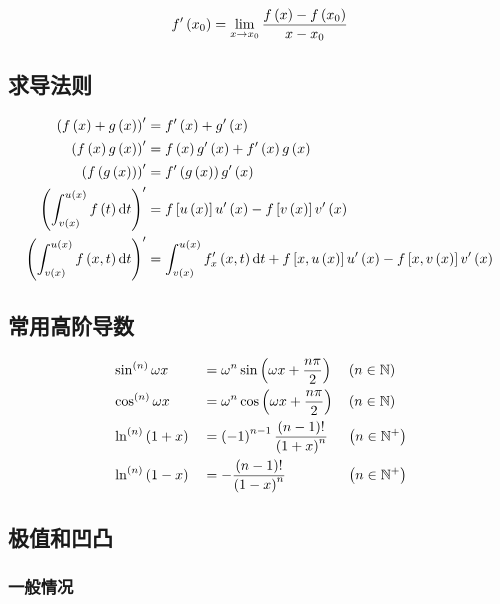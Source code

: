 \documentclass{article}
\begin{document}
\[f^\prime\left(x_0\right)=\lim_{x\to x_0}\frac{f\left(x\right)-f\left(x_0\right)}{x-x_0}\]

\subsection{求导法则}

\[\begin{aligned}
        \left(f\left(x\right)+g\left(x\right)\right)^\prime                      & =f^\prime\left(x\right)+g^\prime\left(x\right)                                         \\
        \left(f\left(x\right)g\left(x\right)\right)^\prime                       & =f\left(x\right)g^\prime\left(x\right)+f^\prime\left(x\right)g\left(x\right)                             \\
        \left(f\left(g\left(x\right)\right)\right)^\prime                        & =f^\prime\left(g\left(x\right)\right)g^\prime\left(x\right)                                     \\
        \left(\int_{v\left(x\right)}^{u\left(x\right)}f\left(t\right)\mathrm d t\right)^\prime   & =f\left[u\left(x\right)\right]u^\prime\left(x\right)-f\left[v\left(x\right)\right]v^\prime\left(x\right) \\
        \left(\int_{v\left(x\right)}^{u\left(x\right)}f\left(x,t\right)\mathrm d t\right)^\prime & =\int_{v\left(x\right)}^{u\left(x\right)}f_x^\prime\left(x,t\right)\mathrm d t
        +f\left[x,u\left(x\right)\right]u^\prime\left(x\right)-f\left[x,v\left(x\right)\right]v^\prime\left(x\right)
    \end{aligned}\]

\subsection{常用高阶导数}

\[\begin{aligned}
         & \sin^{\left(n\right)}\omega x &  & =\omega^n\sin\left(\omega x+\frac{n\pi}2\right)   &  & \left(n\in\mathbb N\right)  \\
         & \cos^{\left(n\right)}\omega x &  & =\omega^n\cos{\left(\omega x+\frac{n\pi}2\right)} &  & \left(n\in\mathbb N\right)  \\
         & \ln^{\left(n\right)}\left(1+x\right)   &  & =\left(-1\right)^{n-1}\frac{\left(n-1\right)!}{\left(1+x\right)^n}  &  & \left(n\in\mathbb N^+\right) \\
         & \ln^{\left(n\right)}\left(1-x\right)   &  & =-\frac{\left(n-1\right)!}{\left(1-x\right)^n}             &  & \left(n\in\mathbb N^+\right) \\
    \end{aligned}\]

\subsection{极值和凹凸}

\subsubsection{一般情况}
\end{document}
